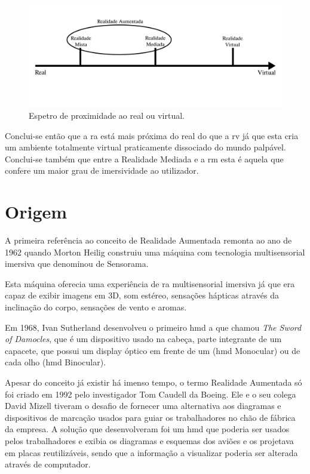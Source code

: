 \documentclass{report}
\begin{document}
\begin{figure}[H]
    \centering
    \includegraphics[width=\textwidth]{spectre.png}
    \caption{Espetro de proximidade ao real ou virtual.}
    \label{Fig:DesktopSpotify}
\end{figure}

Conclui-se então que a \ac{ra} está mais próxima do real do que a \ac{rv} já que esta cria um ambiente totalmente virtual praticamente dissociado do mundo palpável. Conclui-se também que entre a Realidade Mediada e a \ac{rm} esta é aquela que confere um maior grau de imersividade ao utilizador.

\section{Origem}
A primeira referência ao conceito de Realidade Aumentada remonta ao ano de 1962 quando Morton Heilig construiu uma máquina com tecnologia multisensorial imersiva que denominou de Sensorama.

Esta máquina oferecia uma experiência de \ac{ra} multisensorial imersiva já que era capaz de exibir imagens em 3D, som estéreo, sensações hápticas através da inclinação do corpo, sensações de vento e aromas.

Em 1968, Ivan Sutherland desenvolveu o primeiro \ac{hmd} a que chamou \textit{The Sword of Damocles}, que é um dispositivo usado na cabeça, parte integrante de um capacete, que possui um display óptico em frente de um (\ac{hmd} Monocular) ou de cada olho (\ac{hmd} Binocular).

Apesar do conceito já existir há imenso tempo, o termo Realidade Aumentada só foi criado em 1992 pelo investigador Tom Caudell da Boeing. Ele e o seu colega David Mizell tiveram o desafio de fornecer uma alternativa aos diagramas e dispositivos de marcação usados para guiar os trabalhadores no chão de fábrica da empresa. A solução que desenvolveram foi um \ac{hmd} que poderia ser usados pelos trabalhadores e exibia os diagramas e esquemas dos aviões e os projetava em placas reutilizáveis, sendo que a informação a visualizar poderia ser alterada através de computador.
\end{document}

